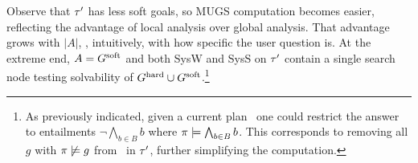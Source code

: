 Observe that $\tau'$ has less soft goals, so MUGS computation becomes
easier, reflecting the advantage of local analysis over global
analysis. That advantage grows with $|A|$, \ie, intuitively, with how
specific the user question is. At the extreme end, $A = G^{\text{\textup{soft}}}$ and
both SysW and SysS on $\tau'$ contain a single search node testing
solvability of $G^{\text{\textup{hard}}} \cup G^{\text{\textup{soft}}}$.\footnote{As previously
  indicated, given a current plan \plan\ one could restrict the answer
  to entailments $\neg \bigwedge_{b \in B} b$ where $\pi \models
  \bigwedge_{b \in B} b$. This corresponds to removing all $g$ with
  $\pi \not\models g$ from \goalsoft\ in $\tau'$, further
  simplifying the computation.}






















